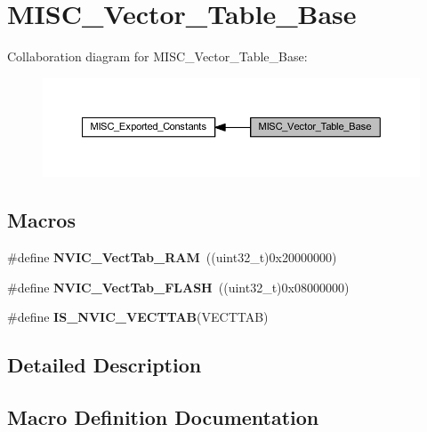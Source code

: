 \hypertarget{group___m_i_s_c___vector___table___base}{}\section{M\+I\+S\+C\+\_\+\+Vector\+\_\+\+Table\+\_\+\+Base}
\label{group___m_i_s_c___vector___table___base}
Collaboration diagram for M\+I\+S\+C\+\_\+\+Vector\+\_\+\+Table\+\_\+\+Base\+:\nopagebreak
\begin{figure}[H]
\begin{center}
\leavevmode
\includegraphics[width=350pt]{group___m_i_s_c___vector___table___base}
\end{center}
\end{figure}
\subsection*{Macros}
\begin{DoxyCompactItemize}
\item 
\mbox{\label{group___m_i_s_c___vector___table___base_ga8be8181cc3e5d42f6204af306ab50f80}} 
\#define {\bfseries N\+V\+I\+C\+\_\+\+Vect\+Tab\+\_\+\+R\+AM}~((uint32\+\_\+t)0x20000000)
\item 
\mbox{\label{group___m_i_s_c___vector___table___base_gafbf92fd28a1090b2aa49732ebd5704b5}} 
\#define {\bfseries N\+V\+I\+C\+\_\+\+Vect\+Tab\+\_\+\+F\+L\+A\+SH}~((uint32\+\_\+t)0x08000000)
\item 
\#define {\bfseries I\+S\+\_\+\+N\+V\+I\+C\+\_\+\+V\+E\+C\+T\+T\+AB}(V\+E\+C\+T\+T\+AB)
\end{DoxyCompactItemize}


\subsection{Detailed Description}


\subsection{Macro Definition Documentation}
\mbox{\label{group___m_i_s_c___vector___table___base_ga26b9d493ccb98fcce9a27303078940c8}} 
